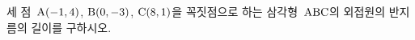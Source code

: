 세 점~$\mathrm{A}(-1{,}\mkern3mu\mathopen{}4)$, $\mathrm{B}(0{,}\mkern3mu\mathopen{}-3)$, $\mathrm{C}(8{,}\mkern3mu\mathopen{}1)$을 꼭짓점으로 하는 삼각형~$\mathrm{ABC}$의 외접원의 반지름의 길이를 구하시오.
